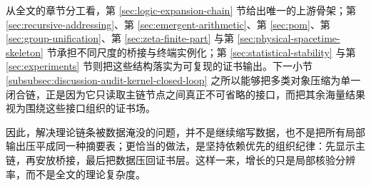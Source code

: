\par
从全文的章节分工看，第 \ref{sec:logic-expansion-chain} 节给出唯一的上游骨架；第 \ref{sec:recursive-addressing}、第 \ref{sec:emergent-arithmetic}、第 \ref{sec:pom}、第 \ref{sec:group-unification}、第 \ref{sec:zeta-finite-part} 与第 \ref{sec:physical-spacetime-skeleton} 节承担不同尺度的桥接与终端实例化；第 \ref{sec:statistical-stability} 与第 \ref{sec:experiments} 节则把这些结构落实为可复现的证书输出。下一小节 \ref{subsubsec:discussion-audit-kernel-closed-loop} 之所以能够把多类对象压缩为单一闭合链，正是因为它只读取主链节点之间真正不可省略的接口，而把其余海量结果视为围绕这些接口组织的证书场。
\par
因此，解决理论链条被数据淹没的问题，并不是继续缩写数据，也不是把所有局部输出压平成同一种摘要表；更恰当的做法，是坚持依赖优先的组织纪律：先显示主链，再安放桥接，最后把数据压回证书层。这样一来，增长的只是局部核验分辨率，而不是全文的理论复杂度。
